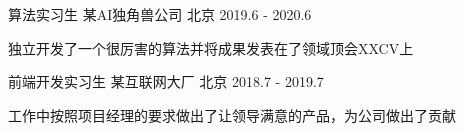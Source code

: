 

\begin{cventries}

  \cventry
    {算法实习生} %
    {某AI独角兽公司} %
    {北京} %
    {2019.6 - 2020.6} %
    {
      \begin{cvitems} %
        \item {独立开发了一个很厉害的算法并将成果发表在了领域顶会XXCV上}
      \end{cvitems}
    }

  \cventry
    {前端开发实习生} %
    {某互联网大厂} %
    {北京} %
    {2018.7 - 2019.7} %
    {
      \begin{cvitems} %
        \item {工作中按照项目经理的要求做出了让领导满意的产品，为公司做出了贡献}
      \end{cvitems}
    }

\end{cventries}
